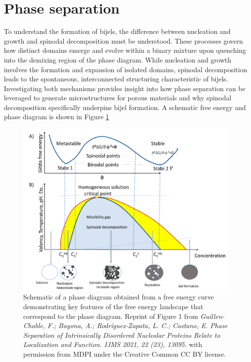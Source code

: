 \section{Phase separation}

To understand the formation of bijels, the difference between nucleation and growth and spinodal decomposition must be understood. These processes 
govern how distinct domains emerge and evolve within a binary mixture upon quenching into the demixing region of the phase diagram. While nucleation and growth involves the formation 
and expansion of isolated domains, spinodal decomposition leads to the spontaneous, interconnected structuring characteristic of bijels. Investigating both mechanisms provides insight 
into how phase separation can be leveraged to generate microstructures for porous materials and why spinodal decomposition specifically underpins bijel formation. A schematic free 
energy and phase diagram is shown in Figure \ref{fig:phase_diagram}

\begin{figure}
    \centering
    \includegraphics[scale = 0.7]{../figures/literature_review/phase_diagram.png}
    \caption{Schematic of a phase diagram obtained from a free energy curve demonstrating key features of the free energy landscape that correspond
             to the phase diagram. Reprint of Figure 1 from 
             \textit{Guillen-Chable, F.; Bayona, A.; Rodríguez-Zapata, L. C.; Castano, E. Phase Separation of Intrinsically Disordered 
             Nucleolar Proteins Relate to Localization and Function. IJMS 2021, 22 (23), 13095.}
             with permission from MDPI under the Creative Common CC BY license.}
    \label{fig:phase_diagram}
\end{figure}

